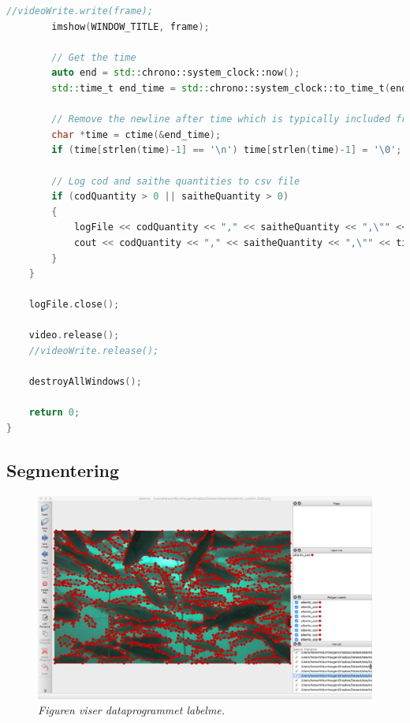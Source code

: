 \begin{lstlisting}[language=C++, caption=main.cpp]
        //videoWrite.write(frame);
        imshow(WINDOW_TITLE, frame);

        // Get the time
        auto end = std::chrono::system_clock::now();
        std::time_t end_time = std::chrono::system_clock::to_time_t(end);

        // Remove the newline after time which is typically included from the C library call
        char *time = ctime(&end_time);
        if (time[strlen(time)-1] == '\n') time[strlen(time)-1] = '\0';

        // Log cod and saithe quantities to csv file
        if (codQuantity > 0 || saitheQuantity > 0)
        {
            logFile << codQuantity << "," << saitheQuantity << ",\"" << time << "\"" << endl;
            cout << codQuantity << "," << saitheQuantity << ",\"" << time << "\"" << endl;
        }
    }

    logFile.close();

    video.release();
    //videoWrite.release();

    destroyAllWindows();

    return 0;
}
\end{lstlisting}


\subsection{Segmentering}

\begin{figure}[h!]
\begin{center} 
\includegraphics[scale=0.25]{figures/labelme}
\caption{\small \sl Figuren viser dataprogrammet labelme. \cite{Wada 2016} \label{fig:labelme}} 
\end{center} 
\end{figure} 
